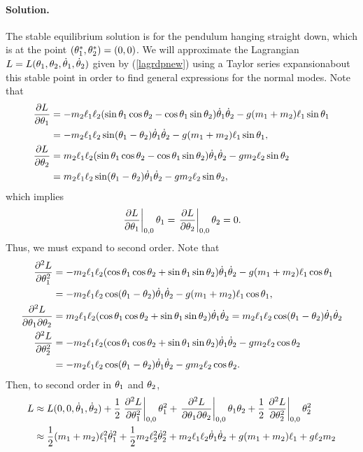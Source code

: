 \documentclass[11pt]{article}
\newcommand{\refeq}[1]{(\ref{#1})}
\newenvironment{solution}
{
    \paragraph{Solution.}
    \ignorespaces
}
{
    \bigskip
}
\begin{document}
\begin{solution}
	The stable equilibrium solution is for the pendulum hanging straight down, which is at the point $(\theta_1^*, \theta_2^*) = (0, 0)$.  We will approximate the Lagrangian $L = L(\theta_1, \theta_2, \dot{\theta}_1, \dot{\theta}_2)$ given by \refeq{lagrdpnew} using a Taylor series expansionabout this stable point in order to find general expressions for the normal modes.  Note that
	\begin{align}
		\pdv{L}{\theta_1} &= -m_2 \ell_1 \ell_2 (\sin{\theta_1} \cos{\theta_2} - \cos{\theta_1} \sin{\theta_2}) \dot{\theta}_1 \dot{\theta}_2 - g (m_1 + m_2) \ell_1 \sin{\theta_1} \\
		&= -m_2 \ell_1 \ell_2 \sin(\theta_1 - \theta_2) \dot{\theta}_1 \dot{\theta}_2 - g (m_1 + m_2) \ell_1 \sin{\theta_1}, \\
		\pdv{L}{\theta_2} &= m_2 \ell_1 \ell_2 (\sin{\theta_1} \cos{\theta_2} - \cos{\theta_1} \sin{\theta_2}) \dot{\theta}_1 \dot{\theta}_2 - g m_2 \ell_2 \sin{\theta_2} \\
		&= m_2 \ell_1 \ell_2 \sin(\theta_1 - \theta_2) \dot{\theta}_1 \dot{\theta}_2 - g m_2 \ell_2 \sin{\theta_2},
	\end{align}
	which implies
	\begin{equation}
		\left. \pdv{L}{\theta_1}\right|_{0, 0} \theta_1 = \left. \pdv{L}{\theta_2}\right|_{0, 0} \theta_2 = 0.
	\end{equation}
	Thus, we must expand to second order.  Note that
	\begin{align}
		\pdv[2]{L}{\theta_1} &= -m_2 \ell_1 \ell_2 (\cos{\theta_1} \cos{\theta_2} + \sin{\theta_1} \sin{\theta_2}) \dot{\theta}_1 \dot{\theta}_2 - g (m_1 + m_2) \ell_1 \cos{\theta_1} \\
		&= -m_2 \ell_1 \ell_2 \cos(\theta_1 - \theta_2) \dot{\theta}_1 \dot{\theta}_2 - g (m_1 + m_2) \ell_1 \cos{\theta_1}, \\
		\pdv[2]{L}{\theta_1}{\theta_2} &= m_2 \ell_1 \ell_2 (\cos{\theta_1} \cos{\theta_2} + \sin{\theta_1} \sin{\theta_2}) \dot{\theta}_1 \dot{\theta}_2 = m_2 \ell_1 \ell_2 \cos(\theta_1 - \theta_2) \dot{\theta}_1 \dot{\theta}_2 \\
		\pdv[2]{L}{\theta_2} &= -m_2 \ell_1 \ell_2 (\cos{\theta_1} \cos{\theta_2} + \sin{\theta_1} \sin{\theta_2}) \dot{\theta}_1 \dot{\theta}_2 - g m_2 \ell_2 \cos{\theta_2} \\
		&= -m_2 \ell_1 \ell_2 \cos(\theta_1 - \theta_2) \dot{\theta}_1 \dot{\theta}_2 - g m_2 \ell_2 \cos{\theta_2}.
	\end{align}
	Then, to second order in $\theta_1$ and $\theta_2$, %
	\begin{align}
		L &\approx L(0, 0, \thdq, \thdw) + \frac{1}{2} \left. \pdv[2]{L}{\thq}\right|_{0, 0} \thq^2 + \left. \pdv[2]{L}{\thq}{\thw}\right|_{0, 0} \thq \thw + \frac{1}{2} \left. \pdv[2]{L}{\thw}\right|_{0, 0} \thw^2 \\
		&\approx \frac{1}{2} (\mq + \mw) \elq^2 \thdq^2 + \frac{1}{2} \mw \elw^2 \thdw^2 + \mw \elq \elw \thdq \thdw + g (\mq + \mw) \elq + g \elw \mw \notag \\

\end{align}
\end{solution}
\end{document}
